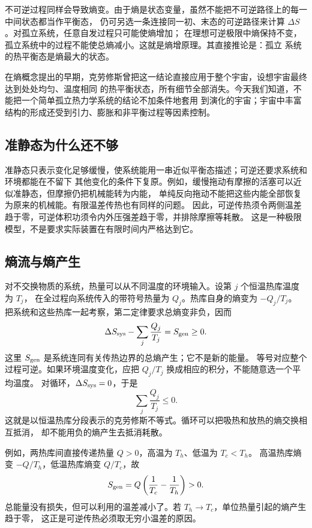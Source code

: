 {不可逆过程同样会导致熵变。由于熵是状态变量，虽然不能把不可逆路径上的每一中间状态都当作平衡态，
仍可另选一条连接同一初、末态的可逆路径来计算 $\Delta S$。对孤立系统，任意自发过程只可能使熵增加；
在理想可逆极限中熵保持不变，孤立系统中的过程不能使总熵减小。这就是熵增原理。其直接推论是：孤立
系统的热平衡态是熵最大的状态。

在熵概念提出的早期，克劳修斯曾把这一结论直接应用于整个宇宙，设想宇宙最终达到处处均匀、温度相同
的热平衡状态，所有细节全部消失。今天我们知道，不能把一个简单孤立热力学系统的结论不加条件地套用
到演化的宇宙；宇宙中丰富结构的形成还受到引力、膨胀和非平衡过程等因素控制。

\subsection{准静态为什么还不够}

准静态只表示变化足够缓慢，使系统能用一串近似平衡态描述；可逆还要求系统和环境都能在不留下
其他变化的条件下复原。例如，缓慢拖动有摩擦的活塞可以近似准静态，但摩擦仍把机械能转为内能，
单纯反向拖动不能把这些内能全部恢复为原来的机械能。有限温差传热也有同样的问题。
因此，可逆传热须令两侧温差趋于零，可逆体积功须令内外压强差趋于零，并排除摩擦等耗散。
这是一种极限模型，不是要求实际装置在有限时间内严格达到它。

\subsection{熵流与熵产生}

对不交换物质的系统，热量可以从不同温度的环境输入。设第 $j$ 个恒温热库温度为 $T_j$，
在全过程向系统传入的带符号热量为 $Q_j$。热库自身的熵变为 $-Q_j/T_j$。
把系统和这些热库一起考察，第二定律要求总熵变非负，因而
\begin{equation}
 \Delta S_{\rm sys}-\sum_j\frac{Q_j}{T_j}=S_{\rm gen}\ge0.
\end{equation}
这里 $S_{\rm gen}$ 是系统连同有关传热边界的总熵产生；它不是新的能量。
等号对应整个过程可逆。如果环境温度变化，应把 $Q_j/T_j$ 换成相应的积分，不能随意选一个平均温度。
对循环，$\Delta S_{\rm sys}=0$，于是
\begin{equation}
 \sum_j\frac{Q_j}{T_j}\le0.
\end{equation}
这就是以恒温热库分段表示的克劳修斯不等式。循环可以把吸热和放热的熵交换相互抵消，
却不能用负的熵产生去抵消耗散。

例如，两热库间直接传递热量 $Q>0$，高温为 $T_h$、低温为 $T_c<T_h$。
高温热库熵变 $-Q/T_h$，低温热库熵变 $Q/T_c$，故
\[
 S_{\rm gen}=Q\left(\frac1{T_c}-\frac1{T_h}\right)>0.
\]
总能量没有损失，但可以利用的温差减小了。若 $T_h\to T_c$，单位热量引起的熵产生趋于零，
这正是可逆传热必须取无穷小温差的原因。

}
